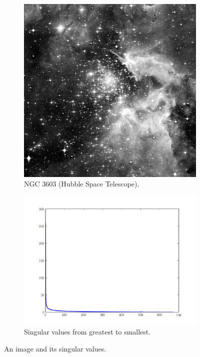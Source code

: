 \begin{figure}
\centering
\begin{subfigure}[b]{.49\textwidth}
\centering
\includegraphics[width=\textwidth]{hubble_red}
\caption{NGC 3603 (Hubble Space Telescope).}
\end{subfigure}
\begin{subfigure}[b]{.49\textwidth}
\centering
\includegraphics[width=\textwidth]{hubble_svals}
\caption{Singular values from greatest to smallest.}
\label{fig:svals_plot}
\end{subfigure}
\caption{An image and its singular values.}
\label{fig:hubble}
\end{figure}

